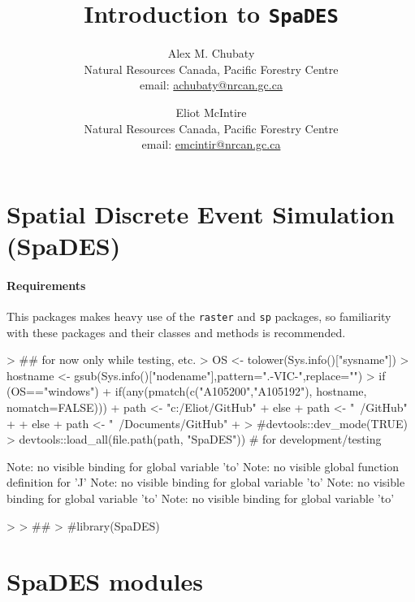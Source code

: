 \documentclass{article}
\title{Introduction to \texttt{SpaDES}}
\author{
  Alex M. Chubaty\\
	\small{Natural Resources Canada, Pacific Forestry Centre}\\
	\small{email: \href{mailto:achubaty@nrcan.gc.ca}{achubaty@nrcan.gc.ca}}
	\and
	Eliot McIntire\\
	\small{Natural Resources Canada, Pacific Forestry Centre}\\
	\small{email: \href{mailto:emcintir@nrcan.gc.ca}{emcintir@nrcan.gc.ca}}
}
\begin{document}


\maketitle

\tableofcontents

\newpage

\section{Spatial Discrete Event Simulation (SpaDES)}

\paragraph{Requirements}
This packages makes heavy use of the \texttt{raster} and \texttt{sp} packages, so familiarity with these packages and their classes and methods is recommended.

\begin{Schunk}
\begin{Sinput}
> ## for now only while testing, etc.
> OS <- tolower(Sys.info()["sysname"])
> hostname <- gsub(Sys.info()["nodename"],pattern=".-VIC-",replace="")
> if (OS=="windows") {
+     if(any(pmatch(c("A105200","A105192"), hostname, nomatch=FALSE))) {
+         path <- "c:/Eliot/GitHub"
+     } else {
+         path <- "~/GitHub"
+     }
+ } else {
+     path <- "~/Documents/GitHub"
+ }
> #devtools::dev_mode(TRUE)
> devtools::load_all(file.path(path, "SpaDES")) # for development/testing
\end{Sinput}
\begin{Soutput}
Note: no visible binding for global variable 'to' 
Note: no visible global function definition for 'J' 
Note: no visible binding for global variable 'to' 
Note: no visible binding for global variable 'to' 
Note: no visible binding for global variable 'to' 
\end{Soutput}
\begin{Sinput}
> 
> ## 
> #library(SpaDES)
\end{Sinput}
\end{Schunk}


\newpage

\section{SpaDES modules}
\end{document}

